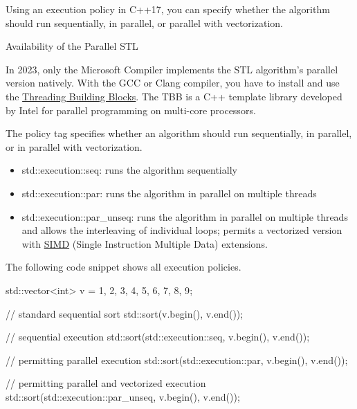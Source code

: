 Using an execution policy in C++17, you can specify whether the algorithm should run sequentially, in parallel, or parallel with vectorization.

\begin{myTip}{Availability of the Parallel STL}
	
In 2023, only the Microsoft Compiler implements the STL algorithm’s parallel version natively. With the GCC or Clang compiler, you have to install and use the \href{https://en.wikipedia.org/wiki/Threading_Building_Blocks}{Threading Building Blocks}. The TBB is a C++ template library developed by Intel for parallel programming on multi-core processors.
\end{myTip}



The policy tag specifies whether an algorithm should run sequentially, in parallel, or in parallel with vectorization.

\begin{itemize}
\item 
std::execution::seq: runs the algorithm sequentially

\item
std::execution::par: runs the algorithm in parallel on multiple threads

\item
std::execution::par\_unseq: runs the algorithm in parallel on multiple threads and allows the interleaving of individual loops; permits a vectorized version with \href{https://en.wikipedia.org/wiki/SIMD}{SIMD} (Single Instruction Multiple Data) extensions.
\end{itemize}

The following code snippet shows all execution policies.


\begin{cpp}
std::vector<int> v = {1, 2, 3, 4, 5, 6, 7, 8, 9};

// standard sequential sort
std::sort(v.begin(), v.end());

// sequential execution
std::sort(std::execution::seq, v.begin(), v.end());

// permitting parallel execution
std::sort(std::execution::par, v.begin(), v.end());

// permitting parallel and vectorized execution
std::sort(std::execution::par_unseq, v.begin(), v.end());
\end{cpp}

